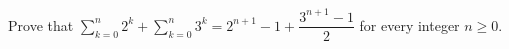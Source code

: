 Prove that $\sum_{k=0}^n2^k+\sum_{k=0}^n3^k=2^{n+1}-1+\dfrac{3^{n+1}-1}{2}$ for every integer $n\ge0$.
